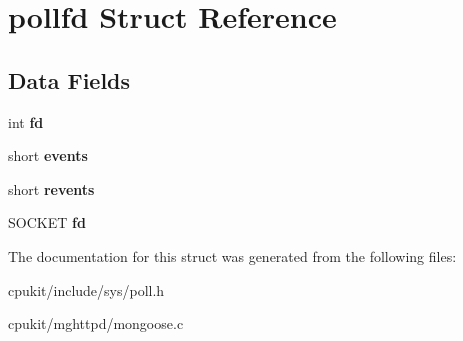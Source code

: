 \hypertarget{structpollfd}{}\section{pollfd Struct Reference}
\label{structpollfd}
\subsection*{Data Fields}
\begin{DoxyCompactItemize}
\item 
\mbox{\label{structpollfd_a57e1c316fb063e468d680b6246147861}} 
int {\bfseries fd}
\item 
\mbox{\label{structpollfd_ac9b2f2c5b1f9a7487eb57e67cd4960ef}} 
short {\bfseries events}
\item 
\mbox{\label{structpollfd_aafb457d11cac415faf0e1e2b825118c2}} 
short {\bfseries revents}
\item 
\mbox{\label{structpollfd_a24e6b7a71f146721f56620a6f8e7606a}} 
S\+O\+C\+K\+ET {\bfseries fd}
\end{DoxyCompactItemize}


The documentation for this struct was generated from the following files\+:\begin{DoxyCompactItemize}
\item 
cpukit/include/sys/poll.\+h\item 
cpukit/mghttpd/mongoose.\+c\end{DoxyCompactItemize}
